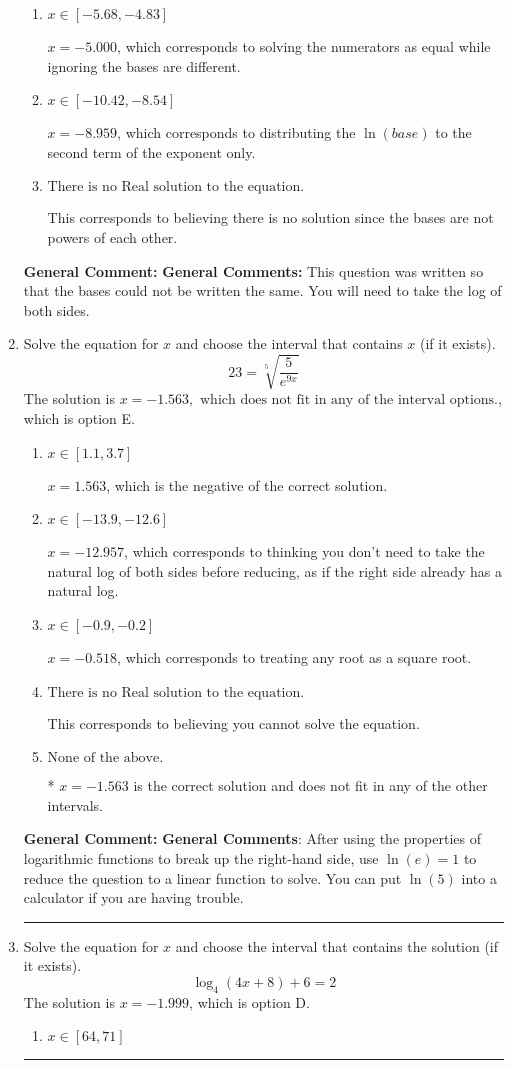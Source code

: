 \documentclass{extbook}[14pt]
\newcommand{\litem}[1]{\item #1

\rule{\textwidth}{0.4pt}}
\begin{document}
\begin{enumerate}
{\begin{enumerate}[label=\Alph*.]
$x = -1.465$, which corresponds to distributing the $\ln(base)$ to the first term of the exponent only.
\item \( x \in [-5.68, -4.83] \)

$x = -5.000$, which corresponds to solving the numerators as equal while ignoring the bases are different.
\item \( x \in [-10.42, -8.54] \)

$x = -8.959$, which corresponds to distributing the $\ln(base)$ to the second term of the exponent only.
\item \( \text{There is no Real solution to the equation.} \)

This corresponds to believing there is no solution since the bases are not powers of each other.
\end{enumerate}

\textbf{General Comment:} \textbf{General Comments:} This question was written so that the bases could not be written the same. You will need to take the log of both sides.
}
\litem{
 Solve the equation for $x$ and choose the interval that contains $x$ (if it exists).
\[  23 = \sqrt[5]{\frac{5}{e^{9x}}} \]
The solution is \( x = -1.563, \text{ which does not fit in any of the interval options.} \), which is option E.\begin{enumerate}[label=\Alph*.]
\item \( x \in [1.1, 3.7] \)

$x = 1.563$, which is the negative of the correct solution.
\item \( x \in [-13.9, -12.6] \)

$x = -12.957$, which corresponds to thinking you don't need to take the natural log of both sides before reducing, as if the right side already has a natural log.
\item \( x \in [-0.9, -0.2] \)

$x = -0.518$, which corresponds to treating any root as a square root.
\item \( \text{There is no Real solution to the equation.} \)

This corresponds to believing you cannot solve the equation.
\item \( \text{None of the above.} \)

* $x = -1.563$ is the correct solution and does not fit in any of the other intervals.
\end{enumerate}

\textbf{General Comment:} \textbf{General Comments}: After using the properties of logarithmic functions to break up the right-hand side, use $\ln(e) = 1$ to reduce the question to a linear function to solve. You can put $\ln(5)$ into a calculator if you are having trouble.
}
\litem{
Solve the equation for $x$ and choose the interval that contains the solution (if it exists).
\[ \log_{4}{(4x+8)}+6 = 2 \]
The solution is \( x = -1.999 \), which is option D.\begin{enumerate}[label=\Alph*.]
\item \( x \in [64, 71] \)


\end{enumerate}}
\end{enumerate}
\end{document}
